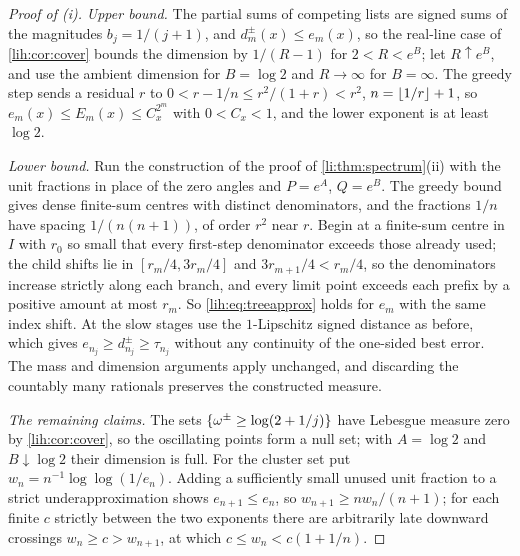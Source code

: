 \begin{proof}[Proof of \textup{(i)}]
\emph{Upper bound.} The partial sums of competing lists are signed sums of the magnitudes $b_j=1/(j+1)$,
and $d_m^\pm(x)\le e_m(x)$, so the real-line case of \cref{lih:cor:cover} bounds the dimension by $1/(R-1)$ for
$2<R<e^B$; let $R\uparrow e^B$, and use the ambient dimension for $B=\log2$ and $R\to\infty$ for $B=\infty$.
The greedy step sends a residual $r$ to $0<r-1/n\le r^2/(1+r)<r^2$, $n=\lfloor1/r\rfloor+1$, so
$e_m(x)\le E_m(x)\le C_x^{2^m}$ with $0<C_x<1$, and the lower exponent is at least $\log2$.

\emph{Lower bound.} Run the construction of the proof of \cref{li:thm:spectrum}(ii) with the unit fractions
in place of the zero angles and $P=e^A$, $Q=e^B$. The greedy bound gives dense finite-sum centres with
distinct denominators, and the fractions $1/n$ have spacing $1/(n(n+1))$, of order $r^2$ near $r$. Begin at
a finite-sum centre in $I$ with $r_0$ so small that every first-step denominator exceeds those already
used; the child shifts lie in $[r_m/4,3r_m/4]$ and $3r_{m+1}/4<r_m/4$, so the denominators increase strictly
along each branch, and every limit point exceeds each prefix by a positive amount at most $r_m$. So
\eqref{lih:eq:treeapprox} holds for $e_m$ with the same index shift. At the slow stages use the
$1$-Lipschitz signed distance as before, which gives $e_{n_j}\ge d_{n_j}^\pm\ge\tau_{n_j}$ without any continuity of
the one-sided best error. The mass and dimension arguments apply unchanged, and discarding the
countably many rationals preserves the constructed measure.

\emph{The remaining claims.} The sets $\{\omega^\pm\ge\log(2+1/j)\}$ have Lebesgue measure zero by
\cref{lih:cor:cover}, so the oscillating points form a null set; with $A=\log2$ and $B\downarrow\log2$ their dimension
is full. For the cluster set put $w_n=n^{-1}\log\log(1/e_n)$. Adding a sufficiently small unused unit fraction
to a strict underapproximation shows $e_{n+1}\le e_n$, so $w_{n+1}\ge nw_n/(n+1)$; for each finite $c$ strictly
between the two exponents there are arbitrarily late downward crossings $w_n\ge c>w_{n+1}$, at which
$c\le w_n<c(1+1/n)$.
\end{proof}

